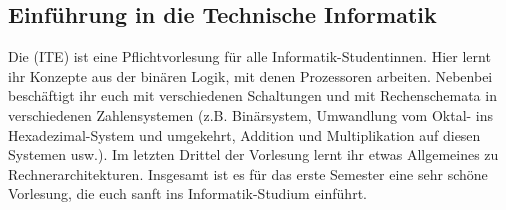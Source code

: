 \subsection{Einführung in die Technische Informatik}
\label{info2}
Die  (\gls{ITE}) ist eine Pflichtvorlesung für alle Informatik-Studentinnen. Hier lernt ihr Konzepte aus der binären Logik, mit denen Prozessoren arbeiten. Nebenbei beschäftigt ihr euch mit verschiedenen Schaltungen und mit Rechenschemata in verschiedenen Zahlensystemen (z.B. Binärsystem, Umwandlung vom Oktal- ins Hexadezimal-System und umgekehrt, Addition und Multiplikation auf diesen Systemen usw.). Im letzten Drittel der Vorlesung lernt ihr etwas Allgemeines zu Rechnerarchitekturen. Insgesamt ist es für das erste Semester eine sehr schöne Vorlesung, die euch sanft ins Informatik-Studium einführt.

